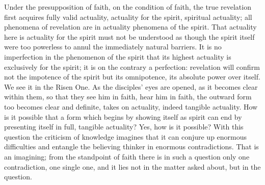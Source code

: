\documentclass[12pt]{book}
\newcommand{\opage}[1]{\marginnote{\footnotesize\textit{[#1]}}}
\begin{document}
Under the presupposition of faith, on the condition of faith, the true
revelation first acquires fully valid actuality, actuality for the
spirit, spiritual actuality; all phenomena of revelation
\opage{173}\setcounter{footnote}{0}%
are in actuality phenomena of the spirit. That actuality here is
actuality for the spirit must not be understood as though the spirit
itself were too powerless to annul the immediately natural barriers. It
is no imperfection in the phenomenon of the spirit that its highest
actuality is exclusively for the spirit; it is on the contrary a
perfection: revelation will confirm not the impotence of the spirit but
its omnipotence, its absolute power over itself. We see it in the Risen
One. As the disciples' eyes are opened, as it becomes clear within them,
so that they see him in faith, hear him in faith, the outward form too
becomes clear and definite, takes on actuality, indeed tangible
actuality. How is it possible that a form which begins by showing itself
as spirit can end by presenting itself in full, tangible actuality?
Yes, how is it possible? With this question the criticism of knowledge
imagines that it can conjure up enormous difficulties and entangle the
believing thinker in enormous contradictions. That is an imagining; from
the standpoint of faith there is in such a question only one
contradiction, one single one, and it lies not in the matter asked
about, but in the question.
\end{document}
